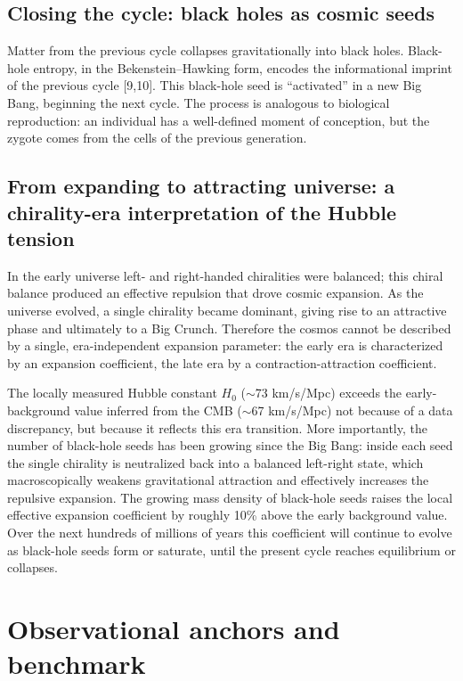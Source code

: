 \documentclass[11pt,a4paper]{article}
\begin{document}
\subsection{Closing the cycle: black holes as cosmic seeds}
Matter from the previous cycle collapses gravitationally into black holes. Black-hole entropy, in the Bekenstein--Hawking form, encodes the informational imprint of the previous cycle [9,10]. This black-hole seed is ``activated'' in a new Big Bang, beginning the next cycle. The process is analogous to biological reproduction: an individual has a well-defined moment of conception, but the zygote comes from the cells of the previous generation.

\subsection{From expanding to attracting universe: a chirality-era interpretation of the Hubble tension}
In the early universe left- and right-handed chiralities were balanced; this chiral balance produced an effective repulsion that drove cosmic expansion. As the universe evolved, a single chirality became dominant, giving rise to an attractive phase and ultimately to a Big Crunch. Therefore the cosmos cannot be described by a single, era-independent expansion parameter: the early era is characterized by an expansion coefficient, the late era by a contraction-attraction coefficient.

The locally measured Hubble constant $H_0$ ($\sim$73 km/s/Mpc) exceeds the early-background value inferred from the CMB ($\sim$67 km/s/Mpc) not because of a data discrepancy, but because it reflects this era transition. More importantly, the number of black-hole seeds has been growing since the Big Bang: inside each seed the single chirality is neutralized back into a balanced left-right state, which macroscopically weakens gravitational attraction and effectively increases the repulsive expansion. The growing mass density of black-hole seeds raises the local effective expansion coefficient by roughly 10\% above the early background value. Over the next hundreds of millions of years this coefficient will continue to evolve as black-hole seeds form or saturate, until the present cycle reaches equilibrium or collapses.

\section{Observational anchors and benchmark}
\end{document}
